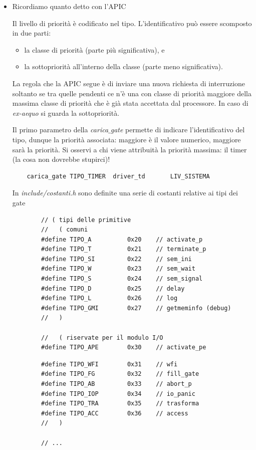 \documentclass[11pt]{report}
\theoremstyle{definition}
\begin{document}
\begin{itemize}
		\item Ricordiamo quanto detto con l'APIC
	\small
	\begin{framed}
		\noindent Il livello di priorità è codificato nel tipo. L'identificativo può essere scomposto in due parti:
		\begin{itemize}
			\item la classe di priorità (parte più significativa), e 
			\item la sottopriorità all'interno della classe (parte meno significativa).
		\end{itemize}
		La regola che la APIC segue è di inviare una nuova richiesta di interruzione soltanto se tra quelle pendenti ce n'è una con classe di priorità maggiore della massima classe di priorità che è già stata accettata dal processore. In caso di \emph{ex-aequo} si guarda la sottopriorità.
	\end{framed}
	\normalsize Il primo parametro della \emph{carica$\_$gate} permette di indicare l'identificativo del tipo, dunque la priorità associata: maggiore è il valore numerico, maggiore sarà la priorità. Si osservi a chi viene attribuità la priorità massima: il timer (la cosa non dovrebbe stupirci)!
	\begin{verbatim}
	carica_gate TIPO_TIMER  driver_td       LIV_SISTEMA
	\end{verbatim}
	In \emph{include/costanti.h} sono definite una serie di costanti relative ai tipi dei gate
	\small
	\begin{multicols}{2}
	\begin{verbatim}
		// ( tipi delle primitive
		//   ( comuni
		#define TIPO_A			0x20	// activate_p
		#define TIPO_T			0x21	// terminate_p
		#define TIPO_SI			0x22	// sem_ini
		#define TIPO_W			0x23	// sem_wait
		#define TIPO_S			0x24	// sem_signal
		#define TIPO_D			0x25	// delay
		#define TIPO_L			0x26	// log
		#define TIPO_GMI		0x27	// getmeminfo (debug)
		//   )
		
		//   ( riservate per il modulo I/O
		#define TIPO_APE		0x30	// activate_pe
	\end{verbatim}
	\columnbreak 
	\begin{verbatim}
		#define TIPO_WFI		0x31	// wfi
		#define TIPO_FG			0x32	// fill_gate
		#define TIPO_AB			0x33	// abort_p
		#define TIPO_IOP		0x34	// io_panic
		#define TIPO_TRA		0x35	// trasforma
		#define TIPO_ACC		0x36	// access
		//   )
		
		// ...
		

\end{verbatim}
\end{multicols}
\end{itemize}
\end{document}
